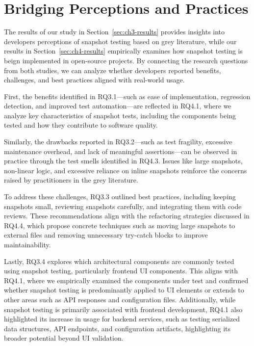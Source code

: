 \documentclass[
	msc, %
	english %
]{../ppgccufmg}
\begin{document}
        \section{Bridging Perceptions and Practices}

        The results of our study in Section~\ref{sec:ch3-results} provides insights into developers perceptions of snapshot testing based on grey literature, while our results in Section~\ref{sec:ch4-results} empirically examines how snapshot testing is beign implemented in open-source projects. By connecting the research questions from both studies, we can analyze whether developers reported benefits, challenges, and best practices aligned with real-world usage.

        First, the benefits identified in RQ3.1—such as ease of implementation, regression detection, and improved test automation—are reflected in RQ4.1, where we analyze key characteristics of snapshot tests, including the components being tested and how they contribute to software quality.
        
        Similarly, the drawbacks reported in RQ3.2—such as test fragility, excessive maintenance overhead, and lack of meaningful assertions—can be observed in practice through the test smells identified in RQ4.3. Issues like large snapshots, non-linear logic, and excessive reliance on inline snapshots reinforce the concerns raised by practitioners in the grey literature.
        
        To address these challenges, RQ3.3 outlined best practices, including keeping snapshots small, reviewing snapshots carefully, and integrating them with code reviews. These recommendations align with the refactoring strategies discussed in RQ4.4, which propose concrete techniques such as moving large snapshots to external files and removing unnecessary try-catch blocks to improve maintainability.
        
        Lastly, RQ3.4 explores which architectural components are commonly tested using snapshot testing, particularly frontend UI components. This aligns with RQ4.1, where we empirically examined the components under test and confirmed whether snapshot testing is predominantly applied to UI elements or extends to other areas such as API responses and configuration files. Additionally, while snapshot testing is primarily associated with frontend development, RQ4.1 also highlighted its increase in usage for backend services, such as testing serialized data structures, API endpoints, and configuration artifacts, highlighting its broader potential beyond UI validation.
        
\end{document}
